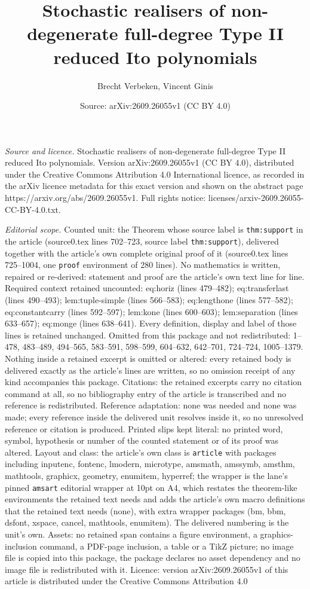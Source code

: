 \documentclass[10pt,a4paper]{amsart}
\title[Stochastic realisers of non-degenerate full-degree Type II r]{Stochastic realisers of non-degenerate full-degree Type II reduced Ito polynomials}
\author{Brecht Verbeken, Vincent Ginis}
\date{Source: arXiv:2609.26055v1 (CC BY 4.0)}
\begin{document}
\maketitle

\noindent\emph{Source and licence.} Stochastic realisers of non-degenerate full-degree Type II reduced Ito polynomials. Version arXiv:2609.26055v1 (CC BY 4.0), distributed under the Creative Commons Attribution 4.0 International licence, as recorded in the arXiv licence metadata for this exact version and shown on the abstract page https://arxiv.org/abs/2609.26055v1. Full rights notice: licenses/arxiv-2609.26055-CC-BY-4.0.txt.\par\smallskip

\noindent\textit{Editorial scope.} Counted unit: the Theorem whose source label is \texttt{thm:support} in the article (source0.tex lines 702--723, source label \texttt{thm:support}), delivered together with the article's own complete original proof of it (source0.tex lines 725--1004, one \texttt{proof} environment of 280 lines). No mathematics is written, repaired or re-derived: statement and proof are the article's own text line for line. Required context retained uncounted: eq:horiz (lines 479--482); eq:transferlast (lines 490--493); lem:tuple-simple (lines 566--583); eq:lengthone (lines 577--582); eq:constantcarry (lines 592--597); lem:kone (lines 600--603); lem:separation (lines 633--657); eq:monge (lines 638--641). Every definition, display and label of those lines is retained unchanged. Omitted from this package and not redistributed: 1--478, 483--489, 494--565, 583--591, 598--599, 604--632, 642--701, 724--724, 1005--1379. Nothing inside a retained excerpt is omitted or altered: every retained body is delivered exactly as the article's lines are written, so no omission receipt of any kind accompanies this package. Citations: the retained excerpts carry no citation command at all, so no bibliography entry of the article is transcribed and no reference is redistributed. Reference adaptation: none was needed and none was made; every reference inside the delivered unit resolves inside it, so no unresolved reference or citation is produced. Printed slips kept literal: no printed word, symbol, hypothesis or number of the counted statement or of its proof was altered. Layout and class: the article's own class is \texttt{article} with packages including inputenc, fontenc, lmodern, microtype, amsmath, amssymb, amsthm, mathtools, graphicx, geometry, enumitem, hyperref; the wrapper is the lane's pinned \texttt{amsart} editorial wrapper at 10pt on A4, which restates the theorem-like environments the retained text needs and adds the article's own macro definitions that the retained text needs (none), with extra wrapper packages (bm, bbm, dsfont, xspace, cancel, mathtools, enumitem). The delivered numbering is the unit's own. Assets: no retained span contains a figure environment, a graphics-inclusion command, a PDF-page inclusion, a table or a TikZ picture; no image file is copied into this package, the package declares no asset dependency and no image file is redistributed with it. Licence: version arXiv:2609.26055v1 of this article is distributed under the Creative Commons Attribution 4.0 
\end{document}
